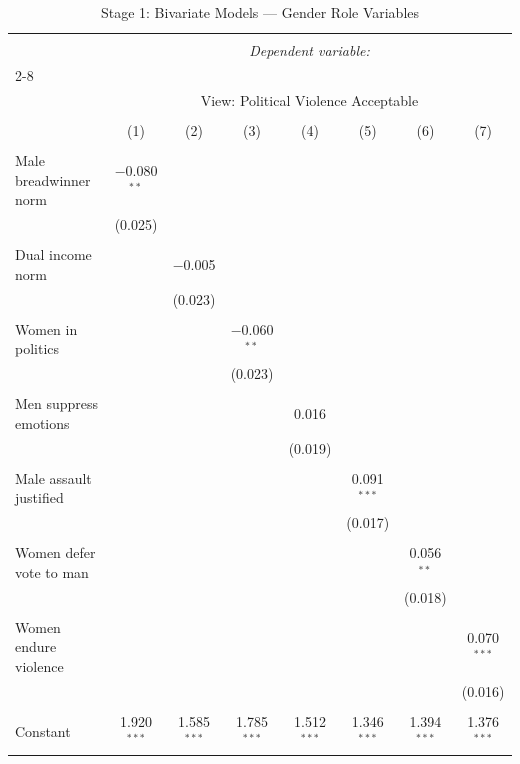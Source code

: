 
\begin{table}[!htbp] \centering 
  \caption{Stage 1: Bivariate Models — Gender Role Variables} 
  \label{} 
\begin{tabular}{@{\extracolsep{5pt}}lccccccc} 
\\[-1.8ex]\hline 
\hline \\[-1.8ex] 
 & \multicolumn{7}{c}{\textit{Dependent variable:}} \\ 
\cline{2-8} 
\\[-1.8ex] & \multicolumn{7}{c}{View: Political Violence Acceptable} \\ 
\\[-1.8ex] & (1) & (2) & (3) & (4) & (5) & (6) & (7)\\ 
\hline \\[-1.8ex] 
 Male breadwinner norm & $-$0.080$^{**}$ &  &  &  &  &  &  \\ 
  & (0.025) &  &  &  &  &  &  \\ 
  & & & & & & & \\ 
 Dual income norm &  & $-$0.005 &  &  &  &  &  \\ 
  &  & (0.023) &  &  &  &  &  \\ 
  & & & & & & & \\ 
 Women in politics &  &  & $-$0.060$^{**}$ &  &  &  &  \\ 
  &  &  & (0.023) &  &  &  &  \\ 
  & & & & & & & \\ 
 Men suppress emotions &  &  &  & 0.016 &  &  &  \\ 
  &  &  &  & (0.019) &  &  &  \\ 
  & & & & & & & \\ 
 Male assault justified &  &  &  &  & 0.091$^{***}$ &  &  \\ 
  &  &  &  &  & (0.017) &  &  \\ 
  & & & & & & & \\ 
 Women defer vote to man &  &  &  &  &  & 0.056$^{**}$ &  \\ 
  &  &  &  &  &  & (0.018) &  \\ 
  & & & & & & & \\ 
 Women endure violence  &  &  &  &  &  &  & 0.070$^{***}$ \\ 
  &  &  &  &  &  &  & (0.016) \\ 
  & & & & & & & \\ 
 Constant & 1.920$^{***}$ & 1.585$^{***}$ & 1.785$^{***}$ & 1.512$^{***}$ & 1.346$^{***}$ & 1.394$^{***}$ & 1.376$^{***}$ \\ 

\end{tabular}
\end{table}
